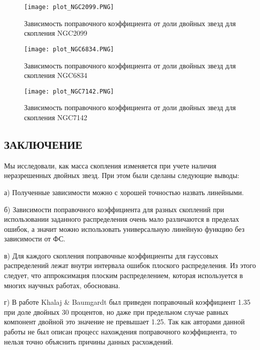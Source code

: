 \documentclass[a4paper,12pt]{article}
\begin{document}
\begin{figure}[h!]\centering
\texttt{[image: plot\_NGC2099.PNG]}
\caption{Зависимость поправочного коэффициента от доли двойных звезд для скопления NGC2099}
\label{2099}
\end{figure}
\vspace{3cm}

\begin{figure}[h!]\centering
\texttt{[image: plot\_NGC6834.PNG]}
\caption{Зависимость поправочного коэффициента от доли двойных звезд для скопления NGC6834}
\label{6834}
\end{figure}

\begin{figure}[h!]\centering
\texttt{[image: plot\_NGC7142.PNG]}
\caption{Зависимость поправочного коэффициента от доли двойных звезд для скопления NGC7142}
\label{7142}
\end{figure}


\newpage





\begin{center}
\section{\bf{ЗАКЛЮЧЕНИЕ}}
\end{center}
Мы исследовали, как масса скопления изменяется при учете наличия неразрешенных двойных звезд. При этом были сделаны следующие выводы:

а) Полученные зависимости можно с хорошей точностью назвать линейными.

б) Зависимости поправочного коэффициента для разных скоплений при использовании заданного распределения очень мало различаются в пределах ошибок, а значит можно использовать универсальную линейную функцию без зависимости от ФС.

в) Для каждого скопления поправочные коэффициенты для гауссовых распределений лежат внутри интервала ошибок плоского распределения. Из этого следует, что аппроксимация плоским распределением, которая используется в многих научных работах, обоснована. 

г) В работе Khalaj \& Baumgardt \cite{Khalaj} был приведен поправочный коэффициент 1.35 при доле двойных 30 процентов, но даже при предельном случае равных компонент двойной это значение не превышает 1.25. Так как авторами данной работы не был описан процесс нахождения поправочного коэффициента, то нельзя точно объяснить причины данных расхождений.
\end{document}
